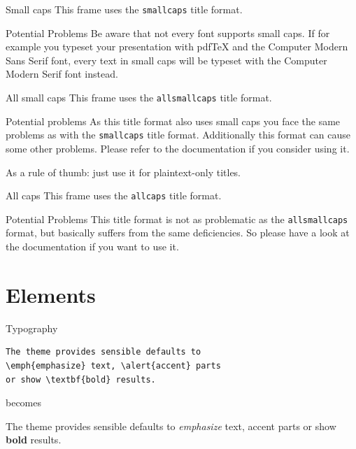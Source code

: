 \documentclass[10pt]{ctexbeamer}
\begin{document}
{
\begin{frame}{Small caps}
	This frame uses the \texttt{smallcaps} title format.

	\begin{alertblock}{Potential Problems}
		Be aware that not every font supports small caps. If for example you typeset your presentation with pdfTeX and the Computer Modern Sans Serif font, every text in small caps will be typeset with the Computer Modern Serif font instead.
	\end{alertblock}
\end{frame}
}

{
\begin{frame}{All small caps}
	This frame uses the \texttt{allsmallcaps} title format.

	\begin{alertblock}{Potential problems}
		As this title format also uses small caps you face the same problems as with the \texttt{smallcaps} title format. Additionally this format can cause some other problems. Please refer to the documentation if you consider using it.

		As a rule of thumb: just use it for plaintext-only titles.
	\end{alertblock}
\end{frame}
}

{
\begin{frame}{All caps}
	This frame uses the \texttt{allcaps} title format.

	\begin{alertblock}{Potential Problems}
		This title format is not as problematic as the \texttt{allsmallcaps} format, but basically suffers from the same deficiencies. So please have a look at the documentation if you want to use it.
	\end{alertblock}
\end{frame}
}

\section{Elements}

\begin{frame}[fragile]{Typography}
      \begin{verbatim}The theme provides sensible defaults to
\emph{emphasize} text, \alert{accent} parts
or show \textbf{bold} results.\end{verbatim}

  \begin{center}becomes\end{center}

  The theme provides sensible defaults to \emph{emphasize} text,
  \alert{accent} parts or show \textbf{bold} results.
\end{frame}
\end{document}
